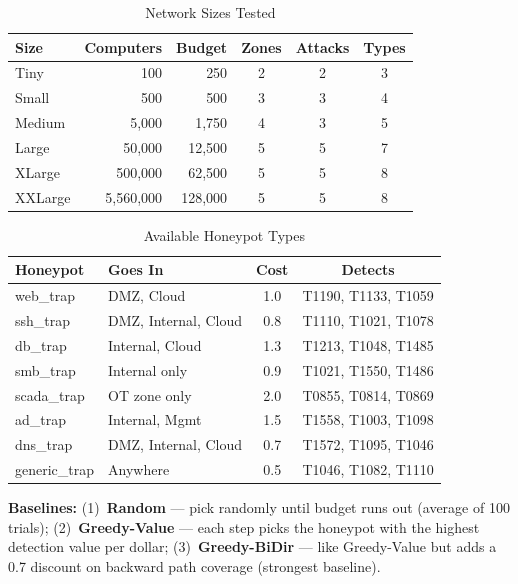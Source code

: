 \documentclass[journal]{IEEEtran}
\begin{document}
\begin{table}[htbp]
\caption{Network Sizes Tested}
\label{tab:scales}
\centering
\renewcommand{\arraystretch}{1.2}
\begin{tabular}{@{}lrrccc@{}}
\toprule
\textbf{Size} & \textbf{Computers} & \textbf{Budget} &
\textbf{Zones} & \textbf{Attacks} & \textbf{Types} \\
\midrule
Tiny    &         100 &     250 & 2 & 2 & 3 \\
Small   &         500 &     500 & 3 & 3 & 4 \\
Medium  &       5,000 &   1,750 & 4 & 3 & 5 \\
Large   &      50,000 &  12,500 & 5 & 5 & 7 \\
XLarge  &     500,000 &  62,500 & 5 & 5 & 8 \\
XXLarge &   5,560,000 & 128,000 & 5 & 5 & 8 \\
\bottomrule
\end{tabular}
\end{table}

\begin{table}[htbp]
\caption{Available Honeypot Types}
\label{tab:profiles}
\centering
\renewcommand{\arraystretch}{1.2}
\begin{tabular}{@{}llcc@{}}
\toprule
\textbf{Honeypot} & \textbf{Goes In} & \textbf{Cost} &
\textbf{Detects} \\
\midrule
web\_trap     & DMZ, Cloud          & 1.0 & T1190, T1133, T1059 \\
ssh\_trap     & DMZ, Internal, Cloud& 0.8 & T1110, T1021, T1078 \\
db\_trap      & Internal, Cloud     & 1.3 & T1213, T1048, T1485 \\
smb\_trap     & Internal only       & 0.9 & T1021, T1550, T1486 \\
scada\_trap   & OT zone only        & 2.0 & T0855, T0814, T0869 \\
ad\_trap      & Internal, Mgmt      & 1.5 & T1558, T1003, T1098 \\
dns\_trap     & DMZ, Internal, Cloud& 0.7 & T1572, T1095, T1046 \\
generic\_trap & Anywhere            & 0.5 & T1046, T1082, T1110 \\
\bottomrule
\end{tabular}
\end{table}

\noindent\textbf{Baselines:}
(1)~\textbf{Random} --- pick randomly until budget runs out
(average of 100 trials);
(2)~\textbf{Greedy-Value} --- each step picks the honeypot
with the highest detection value per dollar;
(3)~\textbf{Greedy-BiDir} --- like Greedy-Value but adds a
0.7 discount on backward path coverage (strongest baseline).
\end{document}
